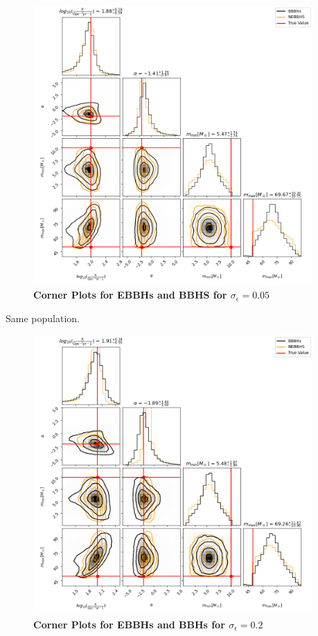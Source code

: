 \documentclass[twocolumn,prd,nofootinbib]{revtex4}
\begin{document}
\begin{figure}

\includegraphics[width=0.95\textwidth]{paper/figures/corfig_0.05.png}
\caption{\label{fig:pop3d05}\textbf{Corner Plots for EBBHs and BBHS for $\sigma_\epsilon=0.05$}}

\end{figure}
Same population.
\begin{figure}

\includegraphics[width=0.95\textwidth]{paper/figures/corfig_0.2.png}
\caption{\label{fig:pop3d05}\textbf{Corner Plots for EBBHs and BBHs for $\sigma_\epsilon=0.2$}}

\end{figure}
\end{document}
